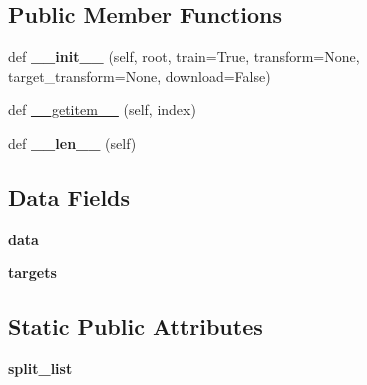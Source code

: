 \subsection*{Public Member Functions}
\begin{DoxyCompactItemize}
\item 
\mbox{\label{classtorchvision_1_1datasets_1_1usps_1_1USPS_ab26f2be660f50fd30d8f14e0ded30d15}} 
def {\bfseries \+\_\+\+\_\+init\+\_\+\+\_\+} (self, root, train=True, transform=None, target\+\_\+transform=None, download=False)
\item 
def \hyperlink{classtorchvision_1_1datasets_1_1usps_1_1USPS_acfed13e69964e378fe59421a91e9e5c2}{\+\_\+\+\_\+getitem\+\_\+\+\_\+} (self, index)
\item 
\mbox{\label{classtorchvision_1_1datasets_1_1usps_1_1USPS_ae5af734d8d50bb4860f55ed85158e4e9}} 
def {\bfseries \+\_\+\+\_\+len\+\_\+\+\_\+} (self)
\end{DoxyCompactItemize}
\subsection*{Data Fields}
\begin{DoxyCompactItemize}
\item 
\mbox{\label{classtorchvision_1_1datasets_1_1usps_1_1USPS_ad446cf28f1924baec19f667038980392}} 
{\bfseries data}
\item 
\mbox{\label{classtorchvision_1_1datasets_1_1usps_1_1USPS_adb0c0589a64cf16eed284d10d1441503}} 
{\bfseries targets}
\end{DoxyCompactItemize}
\subsection*{Static Public Attributes}
\begin{DoxyCompactItemize}
\item 
\mbox{\label{classtorchvision_1_1datasets_1_1usps_1_1USPS_a9221d96eaec8806f8f4518a3913e1297}} 
{\bfseries split\+\_\+list}
\end{DoxyCompactItemize}


